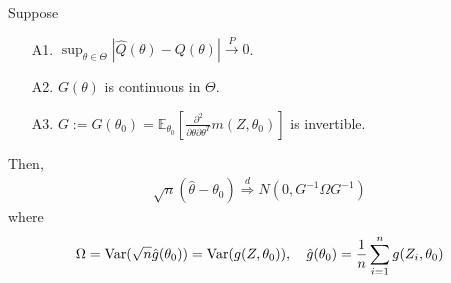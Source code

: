 \documentclass[11pt]{elegantbook}
\begin{document}
\begin{theorem}\label{thm:asymptotic_normality_of_m_estimators}
    Suppose
    \begin{enumerate}
        \item[A1.] $\sup_{\theta\in\Theta}|\hat{Q}(\theta)-Q(\theta)| \stackrel{P}{\longrightarrow} 0$.
        \item[A2.] $G(\theta)$ is continuous in $\Theta$.
        \item[A3.] $G:=G(\theta_0)=\mathbb{E}_{\theta_0}\left[\frac{\partial^2}{\partial \theta\partial \theta^T}m(Z,\theta_0)\right]$ is invertible.
    \end{enumerate}
    Then,
    \begin{equation}
        \begin{aligned}
            \sqrt{n}\left(\hat{\theta}-\theta_0\right) \stackrel{d}{\Rightarrow} N\left(0,G^{-1}\Omega G^{-1}\right)
        \end{aligned}
        \nonumber
    \end{equation}
    where
    \begin{equation}
        \begin{aligned}
            \Omega=\textnormal{Var}(\sqrt{n}\hat{g}(\theta_0))=\textnormal{Var}(g(Z,\theta_0)), \quad \hat{g}(\theta_0)=\frac{1}{n}\sum_{i=1}^n g(Z_i,\theta_0)
        \end{aligned}
        \nonumber
    \end{equation}
\end{theorem}
\end{document}
